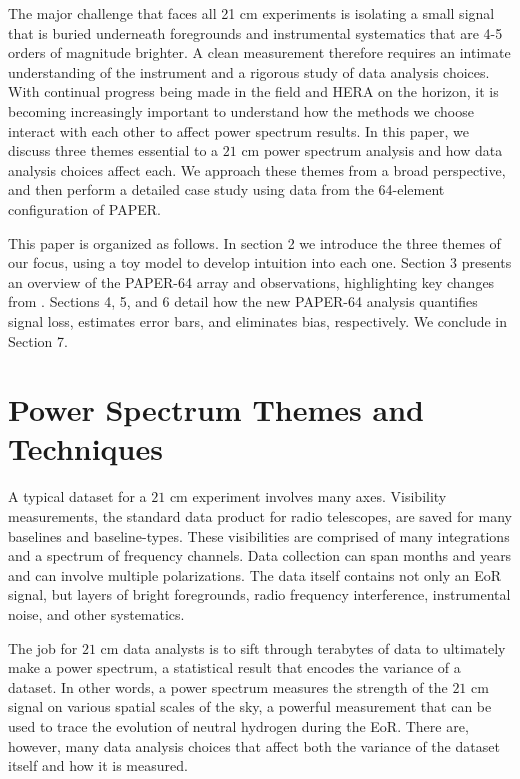 \documentclass[preprint2,numberedappendix,tighten,twocolappendix]{aastex6}  %
\begin{document}
The major challenge that faces all 21 cm experiments is isolating a small signal that is buried underneath foregrounds and instrumental systematics that are 4-5 orders of magnitude brighter. A clean measurement therefore requires an intimate understanding of the instrument and a rigorous study of data analysis choices. With continual progress being made in the field and HERA on the horizon, it is becoming increasingly important to understand how the methods we choose interact with each other to affect power spectrum results. In this paper, we discuss three themes essential to a $21$ cm power spectrum analysis and how data analysis choices affect each. We approach these themes from a broad perspective, and then perform a detailed case study using data from the 64-element configuration of PAPER.

This paper is organized as follows. In section 2 we introduce the three themes of our focus, using a toy model to develop intuition into each one. Section 3 presents an overview of the PAPER-64 array and observations, highlighting key changes from \citet{ali_et_al2015}. Sections 4, 5, and 6 detail how the new PAPER-64 analysis quantifies signal loss, estimates error bars, and eliminates bias, respectively. We conclude in Section 7.

\section{Power Spectrum Themes and Techniques}
\label{sec:Themes}

A typical dataset for a $21$ cm experiment involves many axes. Visibility measurements, the standard data product for radio telescopes, are saved for many baselines and baseline-types. These visibilities are comprised of many integrations and a spectrum of frequency channels. Data collection can span months and years and can involve multiple polarizations. The data itself contains not only an EoR signal, but layers of bright foregrounds, radio frequency interference, instrumental noise, and other systematics.

The job for $21$ cm data analysts is to sift through terabytes of data to ultimately make a power spectrum, a statistical result that encodes the variance of a dataset. In other words, a power spectrum measures the strength of the $21$ cm signal on various spatial scales of the sky, a powerful measurement that can be used to trace the evolution of neutral hydrogen during the EoR. There are, however, many data analysis choices that affect both the variance of the dataset itself and how it is measured. 
\end{document}
